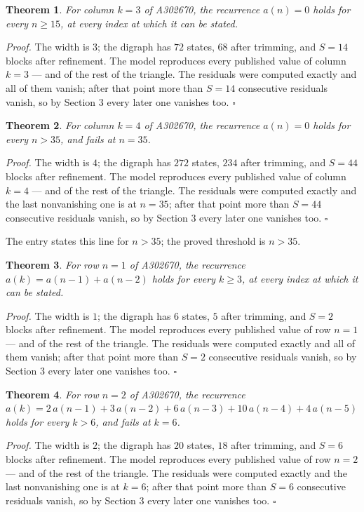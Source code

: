 \documentclass[11pt]{article}
\newtheorem{theorem}{Theorem}
\theoremstyle{definition}
\begin{document}
\begin{theorem} For column $k = 3$ of A302670, the recurrence $a(n) = 0$ holds for every $n \ge 15$, at every index at which it can be stated.\end{theorem}

{\itshape Proof.} The width is $3$; the digraph has $72$ states, $68$ after trimming, and $S = 14$ blocks after refinement. The model reproduces every published value of column $k = 3$ --- and of the rest of the triangle. The residuals were computed exactly and all of them vanish; after that point more than $S = 14$ consecutive residuals vanish, so by Section 3 every later one vanishes too. $\square$

\begin{theorem} For column $k = 4$ of A302670, the recurrence $a(n) = 0$ holds for every $n > 35$, and fails at $n = 35$.\end{theorem}

{\itshape Proof.} The width is $4$; the digraph has $272$ states, $234$ after trimming, and $S = 44$ blocks after refinement. The model reproduces every published value of column $k = 4$ --- and of the rest of the triangle. The residuals were computed exactly and the last nonvanishing one is at $n = 35$; after that point more than $S = 44$ consecutive residuals vanish, so by Section 3 every later one vanishes too. $\square$

The entry states this line for $n > 35$; the proved threshold is $n > 35$.

\begin{theorem} For row $n = 1$ of A302670, the recurrence $a(k) = a(n-1) + a(n-2)$ holds for every $k \ge 3$, at every index at which it can be stated.\end{theorem}

{\itshape Proof.} The width is $1$; the digraph has $6$ states, $5$ after trimming, and $S = 2$ blocks after refinement. The model reproduces every published value of row $n = 1$ --- and of the rest of the triangle. The residuals were computed exactly and all of them vanish; after that point more than $S = 2$ consecutive residuals vanish, so by Section 3 every later one vanishes too. $\square$

\begin{theorem} For row $n = 2$ of A302670, the recurrence $a(k) = 2\,a(n-1) + 3\,a(n-2) + 6\,a(n-3) + 10\,a(n-4) + 4\,a(n-5)$ holds for every $k > 6$, and fails at $k = 6$.\end{theorem}

{\itshape Proof.} The width is $2$; the digraph has $20$ states, $18$ after trimming, and $S = 6$ blocks after refinement. The model reproduces every published value of row $n = 2$ --- and of the rest of the triangle. The residuals were computed exactly and the last nonvanishing one is at $k = 6$; after that point more than $S = 6$ consecutive residuals vanish, so by Section 3 every later one vanishes too. $\square$
\end{document}
